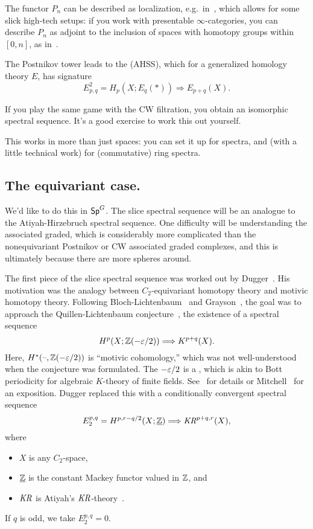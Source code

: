 The functor $P_n$ can be described as localization, e.g.\ in~\cite{MandellShipley}, which allows for some slick
high-tech setups: if you work with presentable $\infty$-categories, you can describe $P_n$ as adjoint to the
inclusion of spaces with homotopy groups within $[0,n]$, as in~\cite[\S5.5.6]{HTT}.

The Postnikov tower leads to the  (AHSS), which for a generalized
homology theory $E$, has signature
\[E_{p,q}^2 = H_p(X; E_q(*))\Longrightarrow E_{p+q}(X).\]
\begin{ex}
If you play the same game with the CW filtration, you obtain an isomorphic spectral sequence. It's a good exercise
to work this out yourself.
\end{ex}
This works in more than just spaces: you can set it up for spectra, and (with a little technical work) for
(commutative) ring spectra.
\subsection*{The equivariant case.}
We'd like to do this in $\mathsf{Sp}^G$. The slice spectral sequence will be an analogue to the Atiyah-Hirzebruch spectral
sequence. One difficulty will be understanding the associated graded, which is considerably more complicated than
the nonequivariant Postnikov or CW associated graded complexes, and this is ultimately because there are more
spheres around.

The first piece of the slice spectral sequence was worked out by Dugger~\cite{DuggerKR}. His motivation was the
analogy between $C_2$-equivariant homotopy theory and motivic homotopy theory. Following
Bloch-Lichtenbaum~\cite{BlochLichtenbaum} and Grayson~\cite{Grayson}, the goal was to approach the
Quillen-Lichtenbaum conjecture~\cite{Quillen}, the existence of a spectral sequence
\[H^p(X; \mathbb Z(-\varepsilon/2))\Longrightarrow K^{p+q}(X).\]
Here, $H^*(\text{--},\mathbb Z(-\varepsilon/2))$ is ``motivic cohomology,'' which was not well-understood when the conjecture was
formulated. The $-\varepsilon/2$ is a , which is akin to Bott periodicity for algebraic $K$-theory of
finite fields. See~\cite{BlochLichtenbaum, Grayson} for details or Mitchell~\cite{Mitchell} for an exposition.
Dugger replaced this with a conditionally convergent spectral sequence
\[E_2^{p,q} = H^{p,r-q/2}(X;\underline{\mathbb Z})\Longrightarrow \mathit{KR}^{p+q,r}(X),\]
where
\begin{itemize}
	\item $X$ is any $C_2$-space,
	\item $\underline{\mathbb Z}$ is the constant Mackey functor valued in $\mathbb Z$, and
	\item $\mathit{KR}$ is Atiyah's $\mathit{KR}$-theory~\cite{AtiyahKR}.
\end{itemize}
If $q$ is odd, we take $E_2^{p,q} = 0$.

